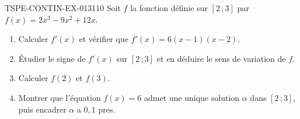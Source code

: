 \begin{exercice}{TSPE-CONTIN-EX-013}{1}{10}
Soit $f$ la fonction définie sur $[2\,;3]$ par $f(x) = 2x^3 - 9x^2 + 12x$.
\begin{enumerate}
  \item Calculer $f'(x)$ et vérifier que $f'(x) = 6(x-1)(x-2)$.
  \item Étudier le signe de $f'(x)$ sur $[2\,;3]$ et en déduire le sens de variation de $f$.
  \item Calculer $f(2)$ et $f(3)$.
  \item Montrer que l'équation $f(x) = 6$ admet une unique solution $\alpha$ dans $[2\,;3]$, puis encadrer $\alpha$ a $0{,}1$ pres.
\end{enumerate}
\end{exercice}
